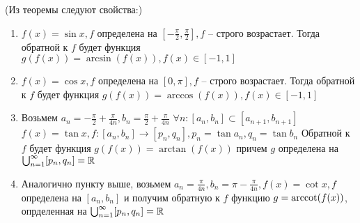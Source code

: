 \begin{properties} (Из теоремы следуют свойства:)
	
	\begin{enumerate}
		\item $f(x) = \sin x, f$ определена на $[-\frac{\pi}{2}, \frac{\pi}{2}], f$ -- строго возрастает.
		Тогда обратной к $f$ будет функция $g(f(x)) = \arcsin (f(x)), f(x) \in [-1, 1]$

		\item $f(x) = \cos x, f$ определена на $[0, \pi], f$ -- строго возрастает.
		Тогда обратной к $f$ будет функция $g(f(x)) = \arccos (f(x)), f(x) \in [-1, 1]$ 
	
		\item Возьмем $a_n = -\frac{\pi}{2} + \frac{\pi}{4n}, b_n = \frac{\pi}{2} + \frac{\pi}{4n}$
		$\forall n: [a_n, b_n] \subset [a_{n+1}, b_{n+1}]$
		$f(x) = \tan x, f: [a_n, b_n] \to [p_n, q_n], p_n = \tan a_n, q_n = \tan b_n$
		Обратной к $f$ будет функция $g(f(x)) = \arctan (f(x))$ причем $g$ определена на $\bigcup_{n=1}^{\infty} [p_n, q_n] = \mathbb{R}$

		\item Аналогично пункту выше, возьмем $a_n = \frac{\pi}{4n}, b_n = \pi - \frac{\pi}{4n}, f(x) = \cot x, f$ определена на $[a_n, b_n]$ и получим
		обратную к $f$ функцию $g = \operatorname{arccot} (f(x))$, опрделенная на $\bigcup_{n=1}^{\infty} [p_n, q_n] = \mathbb{R}$
	\end{enumerate}
\end{properties}



